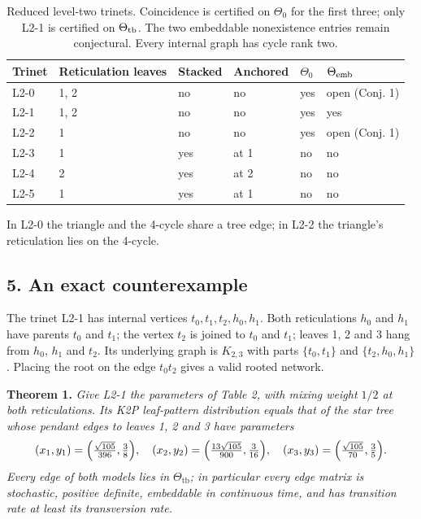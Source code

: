 \documentclass[
  11pt,
]{article}
\newcounter{none} %
\begin{document}
\begin{table}[H]
\centering\small
\caption{Reduced level-two trinets. Coincidence is certified on $\Theta_0$ for the first three; only L2-1 is certified on $\Theta_{\rm tb}$. The two embeddable nonexistence entries remain conjectural. Every internal graph has cycle rank two.}
\begin{tabular}{llllll}
\toprule
Trinet & Reticulation leaves & Stacked & Anchored & $\Theta_0$ & $\Theta_{\rm emb}$\\
\midrule
L2-0 & 1, 2 & no & no & yes & open (Conj. 1)\\
L2-1 & 1, 2 & no & no & yes & yes\\
L2-2 & 1 & no & no & yes & open (Conj. 1)\\
L2-3 & 1 & yes & at 1 & no & no\\
L2-4 & 2 & yes & at 2 & no & no\\
L2-5 & 1 & yes & at 1 & no & no\\
\bottomrule
\end{tabular}
\end{table}

In L2-0 the triangle and the 4-cycle share a tree edge; in L2-2 the
triangle's reticulation lies on the 4-cycle.

\subsection{5. An exact counterexample}\label{an-exact-counterexample}

The trinet L2-1 has internal vertices \(t_0,t_1,t_2,h_0,h_1\). Both
reticulations \(h_0\) and \(h_1\) have parents \(t_0\) and \(t_1\); the
vertex \(t_2\) is joined to \(t_0\) and \(t_1\); leaves 1, 2 and 3 hang
from \(h_0\), \(h_1\) and \(t_2\). Its underlying graph is \(K_{2,3}\)
with parts \(\{t_0,t_1\}\) and \(\{t_2,h_0,h_1\}\). Placing the root on
the edge \(t_0t_2\) gives a valid rooted network.

\textbf{Theorem 1.} \emph{Give L2-1 the parameters of Table 2, with
mixing weight \(1/2\) at both reticulations. Its K2P leaf-pattern
distribution equals that of the star tree whose pendant edges to leaves
1, 2 and 3 have parameters}
\[(x_1,y_1)=\Bigl(\tfrac{\sqrt{105}}{396},\tfrac38\Bigr),\quad (x_2,y_2)=\Bigl(\tfrac{13\sqrt{105}}{900},\tfrac{3}{16}\Bigr),\quad (x_3,y_3)=\Bigl(\tfrac{\sqrt{105}}{70},\tfrac35\Bigr).\]
\emph{Every edge of both models lies in \(\Theta_{\mathrm{tb}}\); in
particular every edge matrix is stochastic, positive definite,
embeddable in continuous time, and has transition rate at least its
transversion rate.}
\end{document}
